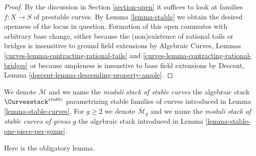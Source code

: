 \begin{proof}
By the discussion in Section \ref{section-open}
it suffices to look at families $f : X \to S$ of
prestable curves. By Lemma \ref{lemma-stable}
we obtain the desired openness of the locus in question.
Formation of this open commutes with arbitrary base change,
either because the (non)existence of rational tails or bridges
is insensitive to ground field extensions by
Algebraic Curves, Lemmas
\ref{curves-lemma-contracting-rational-tails} and
\ref{curves-lemma-contracting-rational-bridges}
or because ampleness is insenstive to base field extensions by
Descent, Lemma \ref{descent-lemma-descending-property-ample}.
\end{proof}

\begin{definition}
\label{definition-deligne-mumford}
\begin{reference}
\cite{DM}
\end{reference}
We denote $\overline{\mathcal{M}}$ and we name the
{\it moduli stack of stable curves} the algebraic stack
$\Curvesstack^{stable}$ parametrizing stable families of curves
introduced in Lemma \ref{lemma-stable-curves}.
For $g \geq 2$ we denote $\overline{\mathcal{M}}_g$ and we name the
{\it moduli stack of stable curves of genus $g$}
the algebraic stack introduced in Lemma \ref{lemma-stable-one-piece-per-genus}.
\end{definition}

\noindent
Here is the obligatory lemma.

